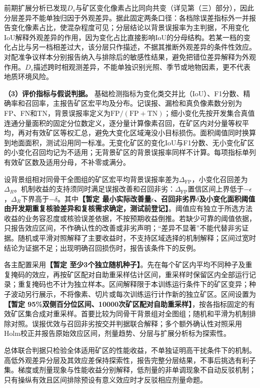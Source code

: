 前期扩展分析已发现$D_s$与矿区变化像素占比同向共变（详见第（三）部分），因此分层差异不能单独归因于外观差异。据此固定两条口径：各档除误差指标外一并报告变化像素占比，使混杂程度可见；分层结论以背景误报率为主判据，不用变化IoU解释外观差异的作用，因为变化占比直接影响IoU的分母结构。若某一档的变化占比与另一档相差过大，该分层只作描述，不据其推断外观差异的条件性效应。对配准争议样本分别报告纳入与排除后的敏感性结果，避免把错位差异解释为外观作用。$D_s$描述跨时相观测差异，不能单独识别光照、季节或地物因素，更不代表地质环境风险。

\textbf{（3）评价指标与假说判据。}
基础检测指标为变化类交并比（IoU）、F1分数、精确率和召回率，主报告矿区宏平均及分布。记误报、漏检和真负像素数分别为FP、FN和TN，背景误报率定义为$\mathrm{FP}/(\mathrm{FP}+\mathrm{TN})$；细小变化先按开发集合真值连通分量面积的固定分位数定义，逐分量计算像素召回，在矿区内对分量等权平均，再对有效矿区等权汇总，避免大变化区域淹没小目标损伤。面积阈值同时换算到地面面积，测试沿用同一标准。无变化矿区的变化IoU与F1分数、无小变化矿区的小变化召回均记为不适用；无背景矿区的背景误报率同样不计算。每项指标单列有效矿区数及适用分母，不补零或满分。

设背景组相对同骨干全图组的矿区宏平均背景误报率差为$\Delta_{\mathrm{FP}}$，小变化召回差为$\Delta_R$。机制收益的支持须同时满足误报改善和召回非劣：$\Delta_{\mathrm{FP}}$置信区间上界低于$-\epsilon$，$\Delta_R$下界高于$-\delta$。其中\textbf{【暂定 最小实际改善量$\epsilon$、召回非劣界$\delta$及小变化面积阈值由开发期重复核验差异和复核需求确定，测试前登记】}。阈值应有独立于所选方法收益的业务容忍度或核验误差依据，不按预期收益倒推。若缺少可靠的阈值依据，只报告效应区间，不作确认性的改善或非劣声明；“差异不显著”不能代替非劣证据。随机或平滑对照解释了主要收益时，不支持区域选择的机制解释；区间过宽时结论为证据不足；出现明确召回损伤时，报告该条件下的反例。

各主配置采用\textbf{【暂定 至少3个独立随机种子】}。先在每个矿区内平均不同种子及重复掩码的效应，再按矿区配对自助重采样估计区间，重采样时保留区内全部运行记录；重复掩码也不计为独立样本。区间解释限于本训练运行条件下的矿区变异；种子波动另行展示，不将像素、切片或每次训练运行计作新的独立矿区。区间设置为\textbf{【暂定 95\%双侧百分位区间、10000次矿区配对自助重采样】}，按各指标固定的有效矿区集合成对重采样。首要比较为同骨干背景组对全图组；随机和平滑为机制排除对照。误报优效与召回非劣按交并判据联合解释；多个额外确认性对照采用Holm校正并报告原始效应区间，剂量趋势、分层与扩展分析标为探索性。

总体联合判据只检验全体适用矿区的性能收益，不单独证明高干扰条件下的机制。高低外观差异分层及其效应差保持探索性，报告完整分层结果，不事后挑选有利子集。梯度或剂量现象与性能收益分别解释，低剂量的非单调现象不自动反驳机制；只有操纵有效且区间排除预设有意义效应时才反驳相应剂量命题。

